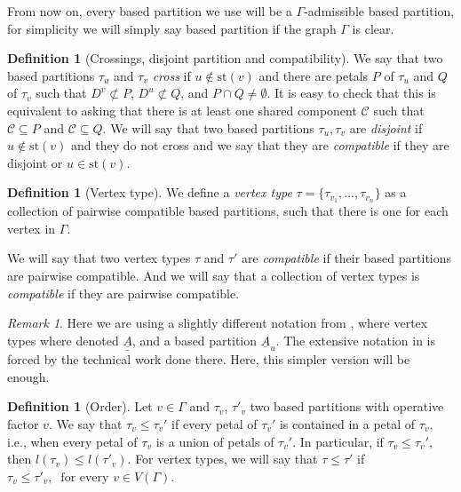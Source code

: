 \documentclass[a4paper]{amsart}
\newcommand{\G}{\Gamma}
\newcommand{\C}{\mathcal{C}}
\newcommand{\st}{\mathrm{st}}
\theoremstyle{definition}
\newtheorem{defi}[teo]{Definition}
\theoremstyle{remark}
\newtheorem*{nota}{Remark}
\begin{document}
From now on, every based partition we use will be a $\Gamma$-admissible based partition, for simplicity we will simply say based partition if the graph $\G$ is clear. 


\begin{defi}[Crossings, disjoint partition and compatibility]
We say that two based partitions $\tau_u$ and $\tau_v$ {\sl cross} if $u\notin \st(v)$ and there are petals $P$ of $\tau_u$ and $Q$ of $\tau_v$ such that  $D^v\not\subset P$, $D^u\not\subset Q$, and $P\cap Q\neq\emptyset$. It is easy to check that this is equivalent to asking that there is at least one shared component $\C$ such that $\C\subseteq P$ and $\C\subseteq Q$. 
 We will say that two based partitions $\tau_u, \tau_v$  are {\sl disjoint} if $u\notin \st(v)$ and they do not cross 
 and we say that they are {\sl compatible} if they are disjoint or $u\in\st(v)$.
\end{defi}


\begin{defi}[Vertex type]
    We define a {\sl vertex type} $\tau=\{\tau_{v_1},...,\tau_{v_n}\}$ as a collection of pairwise compatible based partitions, such that there is one for each vertex in $\G$.

    We will say that two vertex types $\tau$ and $\tau'$ are {\sl compatible} if their based partitions are pairwise compatible. And we will say that a collection of vertex types is {\sl compatible} if they are pairwise compatible.
\end{defi}

\begin{nota}
   Here we are using a slightly different notation from \cite{ArMar}, where vertex types where denoted $\underline{\underline{A}}$, and a based partition $\underline{A}_u$. The extensive notation in \cite{ArMar} is forced by  the technical work done there.  Here, this simpler version will be enough. 
\end{nota}


\begin{defi}[Order]\label{def:order}
    Let $v\in\Gamma$ and $\tau_v$, $\tau'_v$ two based partitions with operative factor $v$.  We say that $\tau_v\leq \tau_v'$ if every petal of $\tau_v'$ is contained in a petal of $\tau_v$, i.e., when every petal of $\tau_v$ is a union of petals of $\tau_v'$. In particular, if $\tau_v\leq \tau_v'$, then $l(\tau_v)\leq l(\tau'_v)$. 
    For vertex types, we will say that $\tau\leq \tau'$ if $\tau_v\leq \tau'_v,\ \textrm{ for every } v\in V(\Gamma)$.
\end{defi}
\end{document}
